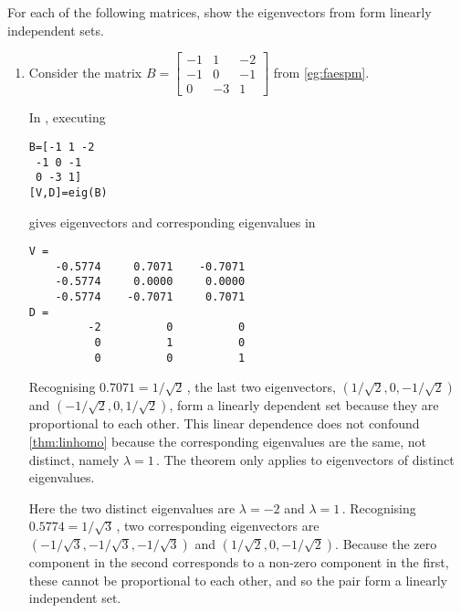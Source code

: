 \begin{example} \label{eg:indepev}
For each of the following matrices, show the eigenvectors from  form linearly independent sets.
\begin{enumerate}
\item  Consider the matrix \(B=\begin{bmatrix}-1&1&-2
\\-1&0&-1
\\0&-3&1 \end{bmatrix}\) from \autoref{eg:faespm}.
\begin{solution} 
In \script, executing 
\begin{verbatim}
B=[-1 1 -2
 -1 0 -1
 0 -3 1]
[V,D]=eig(B)
\end{verbatim}
\setbox\ajrqrbox\hbox{}%
\marginpar{\usebox{\ajrqrbox}}%
gives eigenvectors and corresponding eigenvalues in
\begin{verbatim}
V =
    -0.5774     0.7071    -0.7071
    -0.5774     0.0000     0.0000
    -0.5774    -0.7071     0.7071
D =
         -2          0          0
          0          1          0
          0          0          1
\end{verbatim} 
Recognising \(0.7071=1/\sqrt2\)\,, the last two eigenvectors, \((1/\sqrt2,0,-1/\sqrt2)\) and  \((-1/\sqrt2,0,1/\sqrt2)\), form a linearly dependent set because they are proportional to each other.
This linear dependence does not confound  \autoref{thm:linhomo} because the corresponding eigenvalues are the same, not distinct, namely \(\lambda=1\)\,.
The theorem only applies to eigenvectors of distinct eigenvalues.

Here the two distinct eigenvalues are \(\lambda=-2\) and \(\lambda=1\)\,.
Recognising \(0.5774=1/\sqrt3\)\,, two corresponding eigenvectors are \((-1/\sqrt3,-1/\sqrt3,-1/\sqrt3)\) and \((1/\sqrt2,0,-1/\sqrt2)\).
Because the zero component in the second corresponds to a non-zero component in the first, these cannot be proportional to each other, and so the pair form a linearly independent set.
\end{solution}



\end{enumerate}
\end{example}
